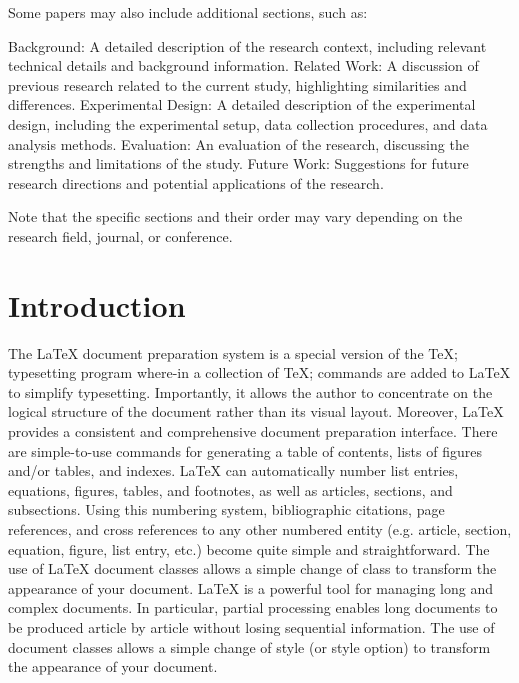 \documentclass{juliacon}
\begin{document}
Some papers may also include additional sections, such as:

    Background: A detailed description of the research context, including relevant technical details and background information.
    Related Work: A discussion of previous research related to the current study, highlighting similarities and differences.
    Experimental Design: A detailed description of the experimental design, including the experimental setup, data collection procedures, and data analysis methods.
    Evaluation: An evaluation of the research, discussing the strengths and limitations of the study.
    Future Work: Suggestions for future research directions and potential applications of the research.

Note that the specific sections and their order may vary depending on the research field, journal, or conference.

\hline

\section{Introduction}

The \LaTeX{} document preparation system is a special version of the
\TeX; typesetting program where-in a collection of \TeX; commands
are added to \LaTeX{} to simplify typesetting. Importantly, it allows
the author to concentrate on the logical structure of the document
rather than its visual layout.\vskip 6pt
Moreover, \LaTeX{} provides a consistent and comprehensive document
preparation interface. There are simple-to-use commands for
generating a table of contents, lists of figures and/or tables, and indexes.
\LaTeX{} can automatically number list entries, equations, figures,
tables, and footnotes, as well as articles, sections, and subsections.
Using this numbering system, bibliographic citations, page
references, and cross references to any other numbered entity (e.g.
article, section, equation, figure, list entry, etc.) become quite simple
and straightforward. The use of \LaTeX{} document classes allows
a simple change of class to transform the appearance of your document.\vskip 6pt
\LaTeX{} is a powerful tool for managing long and complex documents.
In particular, partial processing enables long documents to
be produced article by article without losing sequential information.
The use of document classes allows a simple change of style
(or style option) to transform the appearance of your document.
\end{document}
